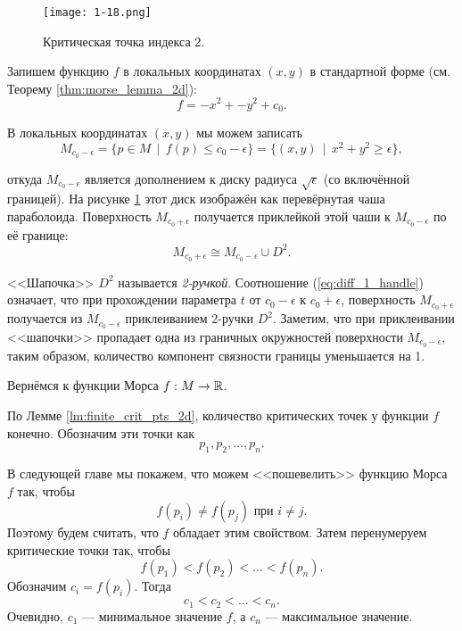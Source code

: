 \documentclass[a4paper,12pt,openany,leqno]{extbook}
\begin{document}
\begin{figure}[ht]
\texttt{[image: 1-18.png]}
\caption{Критическая точка индекса 2.}
\label{fig:p0_index_two}
\end{figure}


Запишем функцию $f$ в локальных координатах $(x, y)$ в стандартной форме (см. Теорему \ref{thm:morse_lemma_2d}):
\begin{equation}
f = -x^2 + -y^2 + c_0.
\end{equation}

В локальных координатах $(x, y)$ мы можем записать
\begin{equation}
M_{c_0 - \epsilon} = \{p \in M\,\mid\,f(p) \leq c_0 - \epsilon\} = \{(x, y)\,\mid\,x^2 + y^2 \geq \epsilon\},
\end{equation}

откуда $M_{c_0 - \epsilon}$ является дополнением к диску радиуса $\sqrt{\epsilon}$ (со включённой границей). На рисунке \ref{fig:p0_index_two} этот диск изображён как перевёрнутая чаша параболоида. Поверхность $M_{c_0 + \epsilon}$ получается приклейкой этой чаши к $M_{c_0 - \epsilon}$ по её границе:
\begin{equation}
M_{c_0 + \epsilon} \cong M_{c_0 - \epsilon} \cup D^2.
\label{eq:diff_2_handle}
\end{equation}

<<Шапочка>> $D^2$ называется \emph{2-ручкой}. Соотношение (\ref{eq:diff_1_handle}) означает, что при прохождении параметра $t$ от $c_0 - \epsilon$ к $c_0 + \epsilon$, поверхность $M_{c_0 + \epsilon}$ получается из $M_{c_0 - \epsilon}$ приклеиванием 2-ручки $D^2$. Заметим, что при приклеивании <<шапочки>> пропадает одна из граничных окружностей поверхности $M_{c_0 - \epsilon}$, таким образом, количество компонент связности границы уменьшается на 1.


Вернёмся к функции Морса $f: M \to \mathbb{R}$.

По Лемме \ref{lm:finite_crit_pts_2d}, количество критических точек у функции $f$ конечно. Обозначим эти точки как
\[p_1, p_2, \ldots, p_n.\]

В следующей главе мы покажем, что можем <<пошевелить>> функцию Морса $f$ так, чтобы
\[f(p_i) \neq f(p_j) \text{ при } i \neq j.\]
Поэтому будем считать, что $f$ обладает этим свойством. Затем перенумеруем критические точки так, чтобы
\begin{equation}
f(p_1) < f(p_2) < \ldots < f(p_n).
\end{equation}
Обозначим $c_i = f(p_i)$. Тогда
\begin{equation}
c_1 < c_2 < \ldots < c_n.
\end{equation}
Очевидно, $c_1$ --- минимальное значение $f$, а $c_n$ --- максимальное значение.
\end{document}
